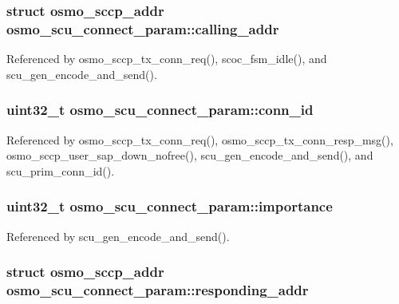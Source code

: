 \subsubsection[{calling\+\_\+addr}]{\setlength{\rightskip}{0pt plus 5cm}struct {\bf osmo\+\_\+sccp\+\_\+addr} osmo\+\_\+scu\+\_\+connect\+\_\+param\+::calling\+\_\+addr}\label{structosmo__scu__connect__param_a2bc67750f26eac6fc530ea037585b0a0}


Referenced by osmo\+\_\+sccp\+\_\+tx\+\_\+conn\+\_\+req(), scoc\+\_\+fsm\+\_\+idle(), and scu\+\_\+gen\+\_\+encode\+\_\+and\+\_\+send().

\subsubsection[{conn\+\_\+id}]{\setlength{\rightskip}{0pt plus 5cm}uint32\+\_\+t osmo\+\_\+scu\+\_\+connect\+\_\+param\+::conn\+\_\+id}\label{structosmo__scu__connect__param_adbf1e55da179ee4d15187d619a211c9a}


Referenced by osmo\+\_\+sccp\+\_\+tx\+\_\+conn\+\_\+req(), osmo\+\_\+sccp\+\_\+tx\+\_\+conn\+\_\+resp\+\_\+msg(), osmo\+\_\+sccp\+\_\+user\+\_\+sap\+\_\+down\+\_\+nofree(), scu\+\_\+gen\+\_\+encode\+\_\+and\+\_\+send(), and scu\+\_\+prim\+\_\+conn\+\_\+id().

\subsubsection[{importance}]{\setlength{\rightskip}{0pt plus 5cm}uint32\+\_\+t osmo\+\_\+scu\+\_\+connect\+\_\+param\+::importance}\label{structosmo__scu__connect__param_a5b498b0b05a5cb3fbf57168abf3706a0}


Referenced by scu\+\_\+gen\+\_\+encode\+\_\+and\+\_\+send().

\subsubsection[{responding\+\_\+addr}]{\setlength{\rightskip}{0pt plus 5cm}struct {\bf osmo\+\_\+sccp\+\_\+addr} osmo\+\_\+scu\+\_\+connect\+\_\+param\+::responding\+\_\+addr}\label{structosmo__scu__connect__param_a3a6464e72eea4b043fee4d7cb0e5ccec}


